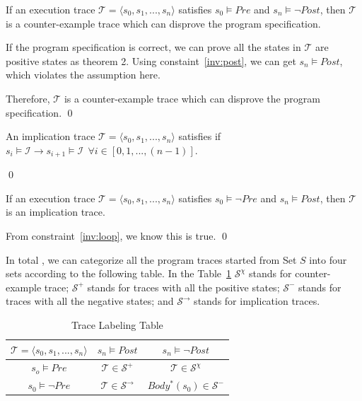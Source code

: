\begin{theorem}
If an execution trace $\mathcal{T} = \langle s_0, s_1, ..., s_n\rangle$ satisfies $s_0 \models Pre$ and $s_n \models \neg Post$,
then $\mathcal{T}$ is a counter-example trace which can disprove the program specification.
\end{theorem}

If the program specification is correct,
we can prove all the states in $\mathcal{T}$ are positive states as theorem 2.
Using constaint~\ref{inv:post}, we can get $s_n \models Post$, which violates the assumption here.

Therefore, $\mathcal{T}$ is a counter-example trace which can disprove the program specification. \hfill \qed

\begin{definition}
An implication trace $\mathcal{T} = \langle s_0, s_1, ..., s_n\rangle$ satisfies if $s_i \models \mathcal{I} \rightarrow s_{i+1} \models \mathcal{I} ~~\forall i \in [0, 1, ..., (n-1)]$.
\end{definition} \hfill \qed

\begin{theorem}
If an execution trace $\mathcal{T} = \langle s_0, s_1, ..., s_n\rangle$ satisfies $s_0 \models \neg Pre$ and $s_n \models Post$,
then $\mathcal{T}$ is an implication trace.
\end{theorem}
From constraint~\ref{inv:loop}, we know this is true. \hfill \qed




In total , we can categorize all the program traces
started from Set $S$ into four sets according to the following table.
In the Table~\ref{tab:labeling}
$\mathcal{S}^\chi$ stands for counter-example trace;
$\mathcal{S}^+$ stands for traces with all the positive states;
$\mathcal{S}^-$ stands for traces with all the negative states; 
and $\mathcal{S}^\rightarrow$ stands for implication traces.

\begin{table}[htb]
\centering
\begin{tabular}[float]{|c|c|c|}
\hline
$\mathcal{T} = \langle s_0, s_1, ..., s_n\rangle$ & $s_n \models Post$            & $s_n \models \neg Post$\\
\hline
$s_o \models Pre$                 & $\mathcal{T} \in \mathcal{S}^+$       		  & $\mathcal{T} \in \mathcal{S}^\chi$\\
\hline
$s_0 \models \neg Pre$            & $\mathcal{T} \in \mathcal{S}^\rightarrow$     & $Body^*(s_0) \in \mathcal{S}^-$\\
\hline
\end{tabular}
\caption{Trace Labeling Table}
\label{tab:labeling}
\end{table}

